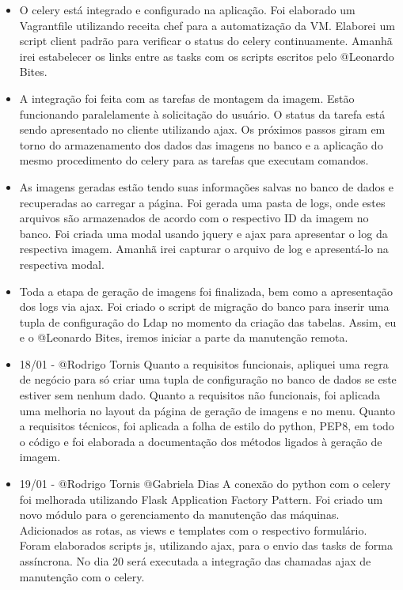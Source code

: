 \begin{itemize}
    \item O celery está integrado e configurado na aplicação. Foi elaborado um Vagrantfile
 utilizando receita chef para a automatização da VM. Elaborei um script client padrão para verificar o status
 do celery continuamente. Amanhã irei estabelecer os links entre as tasks com os scripts escritos pelo
 @Leonardo Bites.

    \item A integração foi feita com as tarefas de montagem da imagem. Estão funcionando
  paralelamente à solicitação do usuário. O status da tarefa está sendo apresentado no cliente utilizando
  ajax. Os próximos passos giram em torno do armazenamento dos dados das imagens no banco e a
  aplicação do mesmo procedimento do celery para as tarefas que executam comandos.


    \item As imagens geradas estão tendo suas informações salvas no banco de dados e
  recuperadas ao carregar a página. Foi gerada uma pasta de logs, onde estes arquivos são armazenados de
  acordo com o respectivo ID da imagem no banco. Foi criada uma modal usando jquery e ajax para
  apresentar o log da respectiva imagem. 
  Amanhã irei capturar o arquivo de log e apresentá-lo na respectiva modal.


    \item Toda a etapa de geração de imagens foi finalizada, bem como a apresentação dos logs via ajax. Foi criado o script de migração do banco para inserir uma tupla de configuração do Ldap no momento da criação das tabelas.
  Assim, eu e o @Leonardo Bites, iremos iniciar a parte da manutenção remota.


    \item 18/01 - @Rodrigo Tornis
  Quanto a requisitos funcionais, apliquei uma regra de negócio para só criar uma tupla de configuração no banco de dados se este estiver sem nenhum dado. Quanto a requisitos não funcionais, foi aplicada uma melhoria no layout da página de geração de imagens e no menu. Quanto a requisitos técnicos, foi aplicada a folha de estilo do python, PEP8, em todo o código e foi elaborada a documentação dos métodos ligados à geração de imagem.


    \item 19/01 - @Rodrigo Tornis @Gabriela Dias
  A conexão do python com o celery foi melhorada utilizando Flask Application Factory Pattern. Foi criado um novo módulo para o gerenciamento da manutenção das máquinas. Adicionados as rotas, as views e templates com o respectivo formulário. Foram elaborados scripts js, utilizando ajax, para o envio das tasks de forma assíncrona. No dia 20 será executada a integração das chamadas ajax de manutenção com o celery.



\end{itemize}

